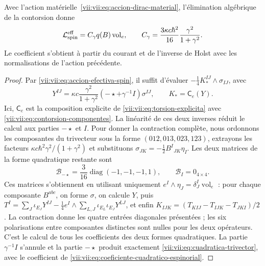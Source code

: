 \begin{theorem}
\label{vii:vii:thm:coeficiente-torsional-espinorial}
Avec l'action matérielle~\eqref{vii:vii:eq:accion-dirac-material},
l'élimination algébrique de la contorsion donne
\begin{equation}
 \mathcal L_{\rm spin}^{\rm eff}
 =C_\gamma q(B)\operatorname{vol}_e,\qquad
 C_\gamma=\frac{3\kappa c\hbar^2}{16}
                      \frac{\gamma^2}{1+\gamma^2}.
 \label{vii:vii:eq:coeficiente-cuadratico-espinorial}
\end{equation}
Le coefficient s'obtient à partir du courant et de l'inverse de Holst
avec les normalisations de l'action précédente.
\end{theorem}
\begin{proof}
Par \eqref{vii:vii:eq:accion-efectiva-spin}, il suffit d'évaluer \(-\frac14K_*^{IJ}\wedge\sigma_{IJ}\), avec
\[
 Y^{IJ}=\kappa c\frac{\gamma^2}{1+\gamma^2}
           (-\star+\gamma^{-1}I)\sigma^{IJ},\qquad
 K_*=\mathsf C_e(Y).
\]
Ici, \(\mathsf C_e\) est la composition explicite de
\eqref{vii:vii:eq:torsion-explicita} avec
\eqref{vii:vii:eq:contorsion-componentes}. La linéarité de ces deux
inverses réduit le calcul aux parties \(-\star\) et \(I\).
Pour donner la contraction complète, nous ordonnons les composantes du
trivecteur sous la forme \((012,013,023,123)\), extrayons les facteurs
\(\kappa c\hbar^2\gamma^2/(1+\gamma^2)\) et substituons
\(\sigma_{JK}=-\frac12B^I{}_{JK}\eta_I\). Les deux matrices
de la forme quadratique restante sont
\begin{equation}
 \mathcal B_{-\star}
 =\frac3{16}\operatorname{diag}(-1,-1,-1,1),\qquad
 \mathcal B_I=0_{4\times4}.
 \label{vii:vii:eq:matrices-contraccion-espinorial}
\end{equation}
Ces matrices s'obtiennent en utilisant uniquement \(e^I\wedge\eta_J=\delta_J^I\operatorname{vol}_e\) : pour chaque composante \(B^{abc}\), on forme \(\sigma\), on calcule \(Y\), puis \(T^I=\sum_J\iota_{E_J}Y^{IJ}
 -\frac14e^I\wedge\sum_{L,J}\iota_{E_L}\iota_{E_J}Y^{LJ}\), et enfin \(K_{IJK}=(T_{KIJ}-T_{IJK}-T_{JKI})/2\). La contraction donne les quatre entrées diagonales présentées ; les six polarisations entre composantes distinctes sont nulles pour les deux opérateurs. C'est le calcul de tous les coefficients des deux formes quadratiques. La partie \(\gamma^{-1}I\) s'annule et la partie \(-\star\) produit exactement \eqref{vii:vii:eq:cuadratica-trivector}, avec le coefficient de \eqref{vii:vii:eq:coeficiente-cuadratico-espinorial}.
\end{proof}

